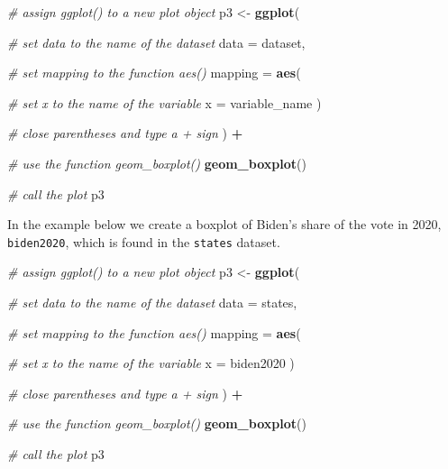 \documentclass[
]{book}
\newenvironment{Shaded}{\begin{snugshade}}{\end{snugshade}}
\newcommand{\AttributeTok}[1]{\textcolor[rgb]{0.13,0.29,0.53}{#1}}
\newcommand{\CommentTok}[1]{\textcolor[rgb]{0.56,0.35,0.01}{\textit{#1}}}
\newcommand{\FunctionTok}[1]{\textcolor[rgb]{0.13,0.29,0.53}{\textbf{#1}}}
\newcommand{\NormalTok}[1]{#1}
\newcommand{\OtherTok}[1]{\textcolor[rgb]{0.56,0.35,0.01}{#1}}
\newcommand{\SpecialCharTok}[1]{\textcolor[rgb]{0.81,0.36,0.00}{\textbf{#1}}}
\begin{document}
\begin{Shaded}
\begin{Highlighting}[]
\CommentTok{\# assign ggplot() to a new plot object}
\NormalTok{p3 }\OtherTok{\textless{}{-}} \FunctionTok{ggplot}\NormalTok{(}
  
  \CommentTok{\# set data to the name of the dataset}
  \AttributeTok{data =}\NormalTok{ dataset,}
  
  \CommentTok{\# set \textasciigrave{}mapping\textasciigrave{} to the function \textasciigrave{}aes()\textasciigrave{}}
  \AttributeTok{mapping =} \FunctionTok{aes}\NormalTok{(}
    
    \CommentTok{\# set \textasciigrave{}x\textasciigrave{} to the name of the variable}
    \AttributeTok{x =}\NormalTok{ variable\_name}
\NormalTok{  )}
  
  \CommentTok{\# close parentheses and type a + sign}
\NormalTok{) }\SpecialCharTok{+}
  
  \CommentTok{\# use the function \textasciigrave{}geom\_boxplot()\textasciigrave{}}
  \FunctionTok{geom\_boxplot}\NormalTok{()}

\CommentTok{\# call the plot}
\NormalTok{p3}
\end{Highlighting}
\end{Shaded}

In the example below we create a boxplot of Biden's share of the vote in 2020, \texttt{biden2020}, which is found in the \texttt{states} dataset.

\begin{Shaded}
\begin{Highlighting}[]
\CommentTok{\# assign ggplot() to a new plot object}
\NormalTok{p3 }\OtherTok{\textless{}{-}} \FunctionTok{ggplot}\NormalTok{(}
  
  \CommentTok{\# set data to the name of the dataset}
  \AttributeTok{data =}\NormalTok{ states,}
  
  \CommentTok{\# set \textasciigrave{}mapping\textasciigrave{} to the function \textasciigrave{}aes()\textasciigrave{}}
  \AttributeTok{mapping =} \FunctionTok{aes}\NormalTok{(}
    
    \CommentTok{\# set \textasciigrave{}x\textasciigrave{} to the name of the variable}
    \AttributeTok{x =}\NormalTok{ biden2020}
\NormalTok{  )}
  
  \CommentTok{\# close parentheses and type a + sign}
\NormalTok{) }\SpecialCharTok{+}
  
  \CommentTok{\# use the function \textasciigrave{}geom\_boxplot()\textasciigrave{}}
  \FunctionTok{geom\_boxplot}\NormalTok{()}

\CommentTok{\# call the plot}
\NormalTok{p3}
\end{Highlighting}
\end{Shaded}
\end{document}
